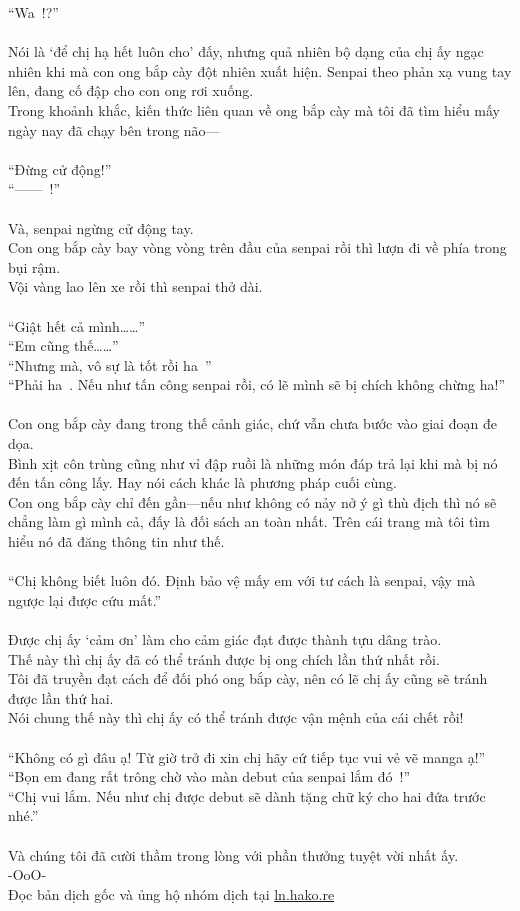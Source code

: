 \documentclass[12pt,a4paper, twosides]{book}
\begin{document}
“Wa~!?”\\
\\
Nói là ‘để chị hạ hết luôn cho’ đấy, nhưng quả nhiên bộ dạng của chị ấy ngạc nhiên khi mà con ong bắp cày đột nhiên xuất hiện. Senpai theo phản xạ vung tay lên, đang cố đập cho con ong rơi xuống.\\
Trong khoảnh khắc, kiến thức liên quan về ong bắp cày mà tôi đã tìm hiểu mấy ngày nay đã chạy bên trong não—\\
\\
“Đừng cử động!”\\
“——~!”\\
\\
Và, senpai ngừng cử động tay.\\
Con ong bắp cày bay vòng vòng trên đầu của senpai rồi thì lượn đi về phía trong bụi rậm.\\
Vội vàng lao lên xe rồi thì senpai thở dài.\\
\\
“Giật hết cả mình……”\\
“Em cũng thế……”\\
“Nhưng mà, vô sự là tốt rồi ha~”\\
“Phải ha~. Nếu như tấn công senpai rồi, có lẽ mình sẽ bị chích không chừng ha!”\\
\\
Con ong bắp cày đang trong thế cảnh giác, chứ vẫn chưa bước vào giai đoạn đe dọa.\\
Bình xịt côn trùng cũng như vỉ đập ruồi là những món đáp trả lại khi mà bị nó đến tấn công lấy. Hay nói cách khác là phương pháp cuối cùng.\\
Con ong bắp cày chỉ đến gần—nếu như không có nảy nở ý gì thù địch thì nó sẽ chẳng làm gì mình cả, đấy là đối sách an toàn nhất. Trên cái trang mà tôi tìm hiểu nó đã đăng thông tin như thế.\\
\\
“Chị không biết luôn đó. Định bảo vệ mấy em với tư cách là senpai, vậy mà ngược lại được cứu mất.”\\
\\
Được chị ấy ‘cảm ơn’ làm cho cảm giác đạt được thành tựu dâng trào.\\
Thế này thì chị ấy đã có thể tránh được bị ong chích lần thứ nhất rồi.\\
Tôi đã truyền đạt cách để đối phó ong bắp cày, nên có lẽ chị ấy cũng sẽ tránh được lần thứ hai.\\
Nói chung thế này thì chị ấy có thể tránh được vận mệnh của cái chết rồi!\\
\\
“Không có gì đâu ạ! Từ giờ trở đi xin chị hãy cứ tiếp tục vui vẻ vẽ manga ạ!”\\
“Bọn em đang rất trông chờ vào màn debut của senpai lắm đó~!”\\
“Chị vui lắm. Nếu như chị được debut sẽ dành tặng chữ ký cho hai đứa trước nhé.”\\
\\
Và chúng tôi đã cười thầm trong lòng với phần thưởng tuyệt vời nhất ấy.\\
-OoO-\\
Đọc bản dịch gốc và ủng hộ nhóm dịch tại \href{https://ln.hako.re/}{ln.hako.re}\\
\newpage
\end{document}
